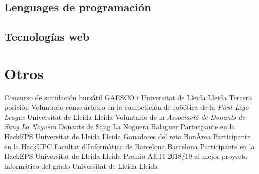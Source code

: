 \documentclass{cv}
\begin{document}
\subsection{Lenguages de programación}

\subsection{Tecnologías web}

\section{Otros}
	{Concurso de simulación bursátil}
	{GAESCO i Universitat de Lleida}
	{Lleida}
	{Tercera posición}
	{}
	{Voluntario como árbitro en la competición de robótica de la
		\textit{First Lego League}}
	{Universitat de Lleida}
	{Lleida}
	{}
	{}
	{Voluntario de la \textit{Associació de Donants de Sang La Noguera}}
	{Donants de Sang La Noguera}
	{Balaguer}
	{}
	{}
	{Participante en la HackEPS}
	{Universitat de Lleida}
	{Lleida}
	{Ganadores del reto BonÀrea}
	{} %
	{Participante en la HackUPC}
	{Facultat d'Informàtica de Barcelona}
	{Barcelona}
	{}
	{} %
	{Participante en la HackEPS}
	{Universitat de Lleida}
	{Lleida}
	{}
	{} %
	{Premio AETI 2018/19 al mejor proyecto informático del grado}
	{Universitat de Lleida}
	{Lleida}
	{}
	{} %
\end{document}
